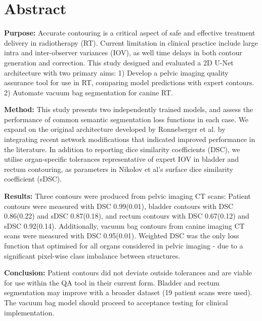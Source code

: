\chapter{Abstract} \label{ch:abstract}

\textbf{Purpose:} Accurate contouring is a critical aspect of safe and effective
treatment delivery in radiotherapy (RT). Current limitation in clinical practice
include large intra and inter-observer variances (IOV), as well time delays in
both contour generation and correction. This study designed and evaluated a 2D U-Net architecture with
two primary aims: 
1) Develop a pelvic imaging quality assurance tool for use in
RT, comparing model predictions with expert contours. 2) Automate vacuum bag
segmentation for canine RT.

\textbf{Method:} This study presents two independently trained models, and
assess the performance of common semantic segmentation loss functions in each
case. We expand on the original architecture developed by Ronneberger et al. by
integrating recent network modifications that indicated improved performance in
the literature. In addition to reporting dice similarity coefficients (DSC), we
utilise organ-specific tolerances representative of expert IOV in bladder
and rectum contouring, as parameters in Nikolov et al's surface dice similarity coefficient
(sDSC).

\textbf{Results:} Three contours were produced from pelvic imaging CT scans:
Patient contours were measured with DSC 0.99(0.01), bladder contours with
DSC 0.86(0.22) and sDSC 0.87(0.18), and rectum contours with DSC 0.67(0.12)
and sDSC 0.92(0.14).  Additionally, vacuum bag contours from canine imaging CT
scans were measured with DSC 0.95(0.01). Weighted DSC was the only loss function
that optimised for all organs considered in pelvic imaging - due to a
significant pixel-wise class imbalance between structures.

\textbf{Conclusion:} Patient contours did not deviate outside tolerances and are
viable for use within the QA tool in their current form.  Bladder and rectum
segmentation may improve with a broader dataset (19 patient scans were used).
The vacuum bag model should proceed to acceptance testing for clinical
implementation.

